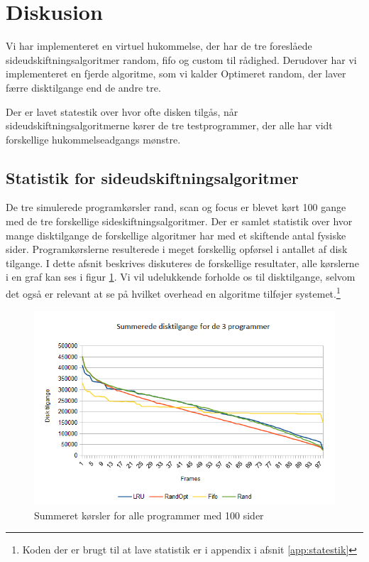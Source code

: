 \section{Diskusion}
\label{sec:diskusion}
Vi har implementeret en virtuel hukommelse, der har de tre foreslåede sideudskiftningsalgoritmer random, fifo og custom til rådighed. Derudover har vi implementeret en fjerde algoritme, som vi kalder Optimeret random, der laver færre disktilgange end de andre tre.

Der er lavet statestik over hvor ofte disken tilgås, når sideudskiftningsalgoritmerne kører de tre testprogrammer, der alle har vidt forskellige hukommelseadgangs mønstre. 

\subsection{Statistik for sideudskiftningsalgoritmer}
\label{subsec:statistik}
De tre simulerede programkørsler rand, scan og focus er blevet kørt 100 gange med de tre forskellige sideskiftningsalgoritmer. Der er samlet statistik over hvor mange disktilgange de forskellige algoritmer har med et skiftende antal fysiske sider. Programkørslerne resulterede i meget forskellig opførsel i antallet af disk tilgange. I dette afsnit beskrives diskuteres de forskellige resultater, alle kørslerne i en graf kan ses i figur \ref{fig:all}. Vi vil udelukkende forholde os til disktilgange, selvom det også er relevant at se på hvilket overhead en algoritme tilføjer systemet.\footnote{Koden der er brugt til at lave statistik er i appendix i afsnit \ref{app:statestik}}

\begin{figure}[ht]
\centerline{\includegraphics[scale=0.8]{graph/stat_all}}
\caption{Summeret kørsler for alle programmer med 100 sider}
\label{fig:all}
\end{figure}

